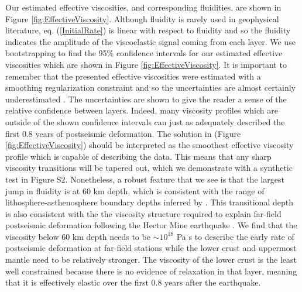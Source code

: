 \documentclass[draft,linenumbers]{AGUJournal}
\begin{document}
Our estimated effective viscosities, and corresponding fluidities, are shown in Figure \ref{fig:EffectiveViscosity}.  Although fluidity is rarely used in geophysical literature, eq. (\ref{InitialRate}) is linear with respect to fluidity and so the fluidity indicates the amplitude of the viscoelastic signal coming from each layer.  We use bootstrapping to find the 95\% confidence intervals for our estimated effective viscosities which are shown in Figure \ref{fig:EffectiveViscosity}.  It is important to remember that the presented effective viscosities were estimated with a smoothing regularization constraint and so the uncertainties are almost certainly underestimated \citep{Aster2011}.  The uncertainties are shown to give the reader a sense of the relative confidence between layers.  Indeed, many viscosity profiles which are outside of the shown confidence intervals can just as adequately described the first 0.8 years of postseismic deformation.  The solution in (Figure \ref{fig:EffectiveViscosity}) should be interpreted as the smoothest effective viscosity profile which is capable of describing the data.  This means that any  sharp viscosity transitions will be tapered out, which we demonstrate with a synthetic test in Figure S2.  Nonetheless, a robust feature that we see is that the largest jump in fluidity is at 60 km depth, which is consistent with the range of lithosphere-asthenosphere boundary depths inferred by \citet{Lekic2011}. This transitional depth is also consistent with the the viscosity structure required to explain far-field postseismic deformation following the Hector Mine earthquake \citep{Freed2007a}. We find that the viscosity below 60 km depth needs to be ${\sim}10^{18}$ Pa s to describe the early rate of postseismic deformation at far-field stations while the lower crust and uppermost mantle need to be relatively stronger.  The viscosity of the lower crust is the least well constrained because there is no evidence of relaxation in that layer, meaning that it is effectively elastic over the first 0.8 years after the earthquake.  
\end{document}
